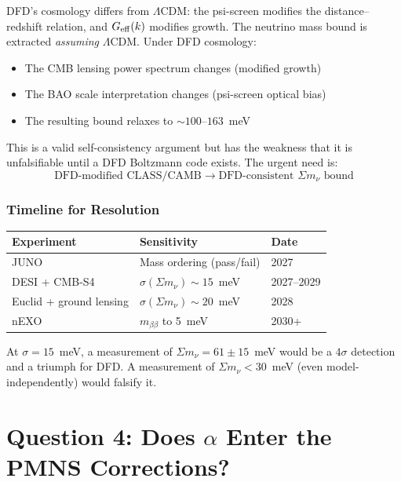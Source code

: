 \documentclass[11pt,a4paper]{article}
\begin{document}
DFD's cosmology differs from $\Lambda$CDM: the psi-screen modifies the
distance--redshift relation, and $G_{\rm eff}(k)$ modifies growth. The
neutrino mass bound is extracted \emph{assuming} $\Lambda$CDM. Under DFD
cosmology:
\begin{itemize}
\item The CMB lensing power spectrum changes (modified growth)
\item The BAO scale interpretation changes (psi-screen optical bias)
\item The resulting bound relaxes to $\sim 100$--$163$~meV
\end{itemize}

This is a valid self-consistency argument but has the weakness that it is
unfalsifiable until a DFD Boltzmann code exists. The urgent need is:
\begin{equation}
\text{DFD-modified CLASS/CAMB} \longrightarrow
\text{DFD-consistent } \Sigma m_\nu \text{ bound}
\end{equation}

\section{Timeline for Resolution}

\begin{center}
\begin{tabular}{lll}
\toprule
Experiment & Sensitivity & Date \\
\midrule
JUNO & Mass ordering (pass/fail) & 2027 \\
DESI + CMB-S4 & $\sigma(\Sigma m_\nu) \sim 15$~meV & 2027--2029 \\
Euclid + ground lensing & $\sigma(\Sigma m_\nu) \sim 20$~meV & 2028 \\
nEXO & $m_{\beta\beta}$ to 5~meV & 2030+ \\
\bottomrule
\end{tabular}
\end{center}

At $\sigma = 15$~meV, a measurement of $\Sigma m_\nu = 61 \pm 15$~meV
would be a $4\sigma$ detection and a triumph for DFD. A measurement of
$\Sigma m_\nu < 30$~meV (even model-independently) would falsify it.


\part{Question 4: Does $\alpha$ Enter the PMNS Corrections?}
\end{document}
